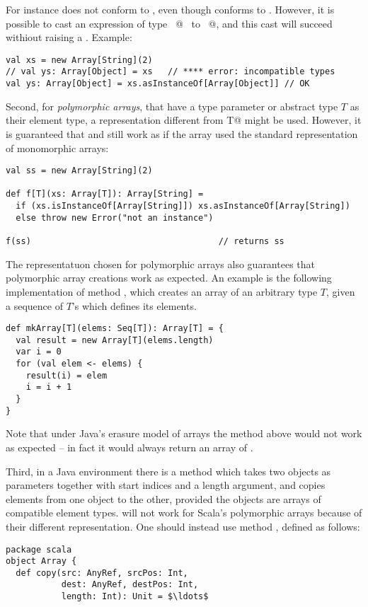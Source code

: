 {{{For instance  does not conform to
, even though  conforms to .
However, it is possible to cast an expression of type
~\lstinline@Array[String]@~ to ~\lstinline@Array[Object]@, and this
cast will succeed withiout raising a . Example:
\begin{lstlisting}
val xs = new Array[String](2)
// val ys: Array[Object] = xs   // **** error: incompatible types
val ys: Array[Object] = xs.asInstanceOf[Array[Object]] // OK
\end{lstlisting}

Second, for {\em polymorphic arrays}, that have a type parameter or
abstract type $T$ as their element type, a representation different
from
\lstinline@[]T@ might be used. However, it is guaranteed that 
 and  still work as if the array 
used the standard representation of monomorphic arrays:
\begin{lstlisting}
val ss = new Array[String](2)

def f[T](xs: Array[T]): Array[String] = 
  if (xs.isInstanceOf[Array[String]]) xs.asInstanceOf[Array[String])
  else throw new Error("not an instance")

f(ss)                                     // returns ss
\end{lstlisting}
The representatuon chosen for polymorphic arrays also guarantees that
polymorphic array creations work as expected. An example is the
following implementation of method \lstinline@mkArray@, which creates
an array of an arbitrary type $T$, given a sequence of $T$'s which
defines its elements.
\begin{lstlisting}
def mkArray[T](elems: Seq[T]): Array[T] = {
  val result = new Array[T](elems.length)
  var i = 0
  for (val elem <- elems) {
    result(i) = elem
    i = i + 1
  }
}
\end{lstlisting}
Note that under Java's erasure model of arrays the method above would
not work as expected -- in fact it would always return an array of
\lstinline@Object@.

Third, in a Java environment there is a method 
which takes two objects as parameters together with start indices and
a length argument, and copies elements from one object to the other,
provided the objects are arrays of compatible element
types.  will not work for Scala's polymorphic
arrays because of their different representation. One should instead
use method , defined as follows:
\begin{lstlisting}
package scala
object Array { 
  def copy(src: AnyRef, srcPos: Int, 
           dest: AnyRef, destPos: Int, 
           length: Int): Unit = $\ldots$
\end{lstlisting}

}}}

